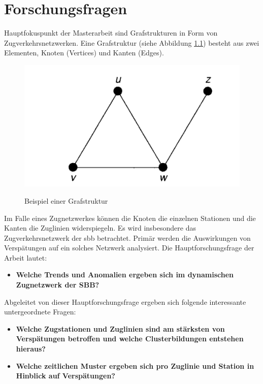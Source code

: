 \chapter{Forschungsfragen}
\label{kap:forschungsfragen}
Hauptfokuspunkt der Masterarbeit sind Grafstrukturen in Form von Zugverkehrsnetzwerken. Eine Grafstruktur (siehe Abbildung \ref{fig_graph_structure}) besteht aus zwei Elementen, Knoten (Vertices) und Kanten (Edges). 
\begin{figure}[H]
    \caption{Beispiel einer Grafstruktur \parencite[S. 8]{wilson_2010}}
    \includegraphics[width=.5\linewidth]{content/00_assets/graph_structure.png}
    \label{fig_graph_structure}
\end{figure}

Im Falle eines Zugnetzwerkes können die Knoten die einzelnen Stationen und die Kanten die Zuglinien widerspiegeln.  Es wird insbesondere das Zugverkehrsnetzwerk der \acrshort{sbb} betrachtet. Primär werden die Auswirkungen von Verspätungen auf ein solches Netzwerk analysiert. Die Hauptforschungsfrage der Arbeit lautet: 

\begin{itemize}
    \item \textbf{Welche Trends und Anomalien ergeben sich im dynamischen Zugnetzwerk der SBB?}
\end{itemize}

Abgeleitet von dieser Hauptforschungsfrage ergeben sich folgende interessante untergeordnete Fragen:

\begin{itemize}
    \item \textbf{Welche Zugstationen und Zuglinien sind am stärksten von Verspätungen betroffen und welche Clusterbildungen entstehen hieraus?}
    \item \textbf{Welche zeitlichen Muster ergeben sich pro Zuglinie und Station in Hinblick auf Verspätungen?}
\end{itemize}
